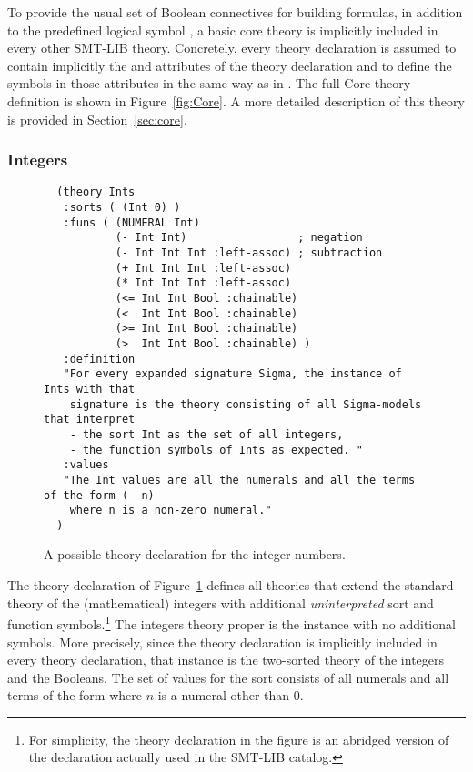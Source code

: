 To provide the usual set of Boolean connectives for building formulas,
in addition to the predefined logical symbol ,
a basic core theory is implicitly included in every other SMT-LIB theory.
Concretely, every theory declaration is assumed 
to contain implicitly the  and  attributes 
of the  theory declaration and 
to define the symbols in those attributes in the same way as in .
The full Core theory definition is shown in Figure~\ref{fig:Core}.
A more detailed description of this theory is provided in Section~\ref{sec:core}.


\subsubsection*{Integers}

\begin{figure}[t]
  \small
  {\color{NavyBlue}
  \begin{verbatim}
  (theory Ints
   :sorts ( (Int 0) )
   :funs ( (NUMERAL Int) 
           (- Int Int)                 ; negation
           (- Int Int Int :left-assoc) ; subtraction
           (+ Int Int Int :left-assoc) 
           (* Int Int Int :left-assoc)
           (<= Int Int Bool :chainable)
           (<  Int Int Bool :chainable)
           (>= Int Int Bool :chainable)
           (>  Int Int Bool :chainable) )
   :definition 
   "For every expanded signature Sigma, the instance of Ints with that
    signature is the theory consisting of all Sigma-models that interpret 
    - the sort Int as the set of all integers,
    - the function symbols of Ints as expected. "
   :values 
   "The Int values are all the numerals and all the terms of the form (- n)
    where n is a non-zero numeral." 
  )
  \end{verbatim}
  }
  \caption{A possible theory declaration for the integer numbers.}
  \label{fig:Integers}
\end{figure}
  
The theory declaration of Figure~\ref{fig:Integers} defines all theories
that extend the standard theory of the (mathematical) integers with additional 
\emph{uninterpreted} sort and function symbols.\footnote{%
For simplicity, the theory declaration in the figure is an abridged version of 
the declaration actually used in the SMT-LIB catalog.
}
The integers theory proper is the instance with no additional symbols.
More precisely,
since the  theory declaration is implicitly included in
every theory declaration,
that instance is the two-sorted theory of the integers and the Booleans.
The set of values for the  sort consists of all numerals and 
all terms of the form 
where $n$ is a numeral other than $0$.


